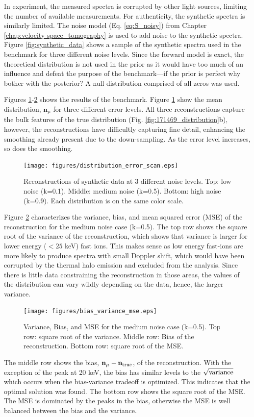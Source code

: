 In experiment, the measured spectra is corrupted by other light sources, limiting the number of available measurements.
For authenticity, the synthetic spectra is similarly limited. The noise model (Eq. \ref{eq:S_noisy}) from Chapter \ref{chap:velocity-space_tomography} is used to add noise to the synthetic spectra. Figure \ref{fig:synthetic_data} shows a sample of the synthetic spectra used in the benchmark for three different noise levels. Since the forward model is exact, the theoretical distribution is not used in the prior as it would have too much of an influence and defeat the purpose of the benchmark---if the prior is perfect why bother with the posterior? A null distribution comprised of all zeros was used.

Figures \ref{fig:synthetic_reconstructions}-\ref{fig:bias_variance_mse} shows the results of the benchmark. Figure \ref{fig:synthetic_reconstructions} show the mean distribution, $\mathbf{n}_\mu$ for three different error levels. All three reconstructions capture the bulk features of the true distribution (Fig. \ref{fig:171469_distribution}b), however, the reconstructions have difficultly capturing fine detail, enhancing the smoothing already present due to the down-sampling. As the error level increases, so does the smoothing. 
\begin{figure}[h!]
    \centering
    \texttt{[image: figures/distribution\_error\_scan.eps]}
    \caption{Reconstructions of synthetic data at 3 different noise levels. Top: low noise (k=0.1). Middle: medium noise (k=0.5). Bottom: high noise (k=0.9). Each distribution is on the same color scale.}
    \label{fig:synthetic_reconstructions}
\end{figure}

Figure \ref{fig:bias_variance_mse} characterizes the variance, bias, and mean squared error (MSE) of the reconstruction for the medium noise case (k=0.5). The top row shows the square root of the variance of the reconstruction, which shows that variance is larger for lower energy ($<25$ keV) fast ions. This makes sense as low energy fast-ions are more likely to produce spectra with small Doppler shift, which would have been corrupted by the thermal halo emission and excluded from the analysis. Since there is little data constraining the reconstruction in those areas, the values of the distribution can vary wildly depending on the data, hence, the larger variance.
\begin{figure}[h!]
    \centering
    \texttt{[image: figures/bias\_variance\_mse.eps]}
    \caption{Variance, Bias, and MSE for the medium noise case (k=0.5). Top row: square root of the variance. Middle row: Bias of the reconstruction. Bottom row: square root of the MSE.}
    \label{fig:bias_variance_mse}
\end{figure}
The middle row shows the bias, $\mathbf{n}_\mu - \mathbf{n}_{\rm{true}}$, of the reconstruction. With the exception of the peak at 20 keV, the bias has similar levels to the $\sqrt{\rm{variance}}$ which occurs when the bias-variance tradeoff is optimized. This indicates that the optimal solution was found. The bottom row shows the square root of the MSE. The MSE is dominated by the peaks in the bias, otherwise the MSE is well balanced between the bias and the variance.


